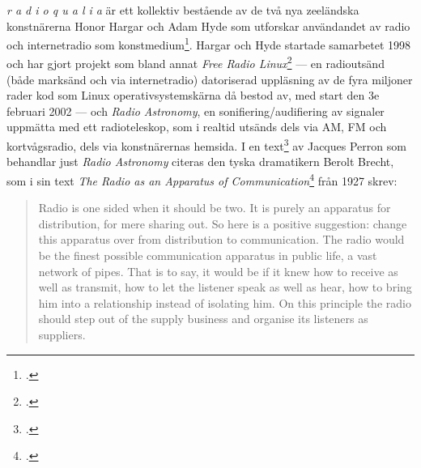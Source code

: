 \documentclass[11pt, a4paper]{article} %
\begin{document}
\emph{r a d i o q u a l i a} är ett kollektiv bestående av de två nya zeeländska konstnärerna Honor Hargar och Adam Hyde som utforskar användandet av radio och internetradio som konstmedium\footcite{noauthor_r_nodate}. Hargar och Hyde startade samarbetet 1998 och har gjort projekt som bland annat \emph{Free Radio Linux}\footcite{noauthor_free_2002} --- en radioutsänd  (både marksänd och via internetradio) datoriserad uppläsning av de fyra miljoner rader kod som Linux operativsystemskärna då bestod av, med start den 3e februari 2002 --- och \emph{Radio Astronomy}, en sonifiering/audifiering av signaler uppmätta med ett radioteleskop, som i realtid utsänds dels via AM, FM och kortvågsradio, dels via konstnärernas hemsida. I en text\footcite{perron_radioqualia_2003} av Jacques Perron som behandlar just \emph{Radio Astronomy} citeras den tyska dramatikern Berolt Brecht, som i sin text \emph{The Radio as an Apparatus of Communication}\footcite{brecht_radio_nodate} från 1927 skrev:
\begin{quote}
  Radio is one sided when it should be two. It is purely an apparatus for distribution, for mere sharing out. So here is a positive suggestion: change this apparatus over from distribution to communication. The radio would be the finest possible communication apparatus in public life, a vast network of pipes. That is to say, it would be if it knew how to receive as well as transmit, how to let the listener speak as well as hear, how to bring him into a relationship instead of isolating him. On this principle the radio should step out of the supply business and organise its listeners as suppliers.
\end{quote}


\end{document}

